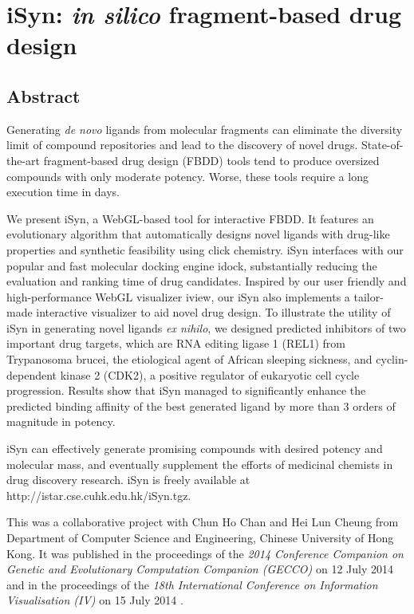 \chapter{iSyn: \textit{in silico} fragment-based drug design}

\section{Abstract}

Generating \textit{de novo} ligands from molecular fragments can eliminate the diversity limit of compound repositories and lead to the discovery of novel drugs. State-of-the-art fragment-based drug design (FBDD) tools tend to produce oversized compounds with only moderate potency. Worse, these tools require a long execution time in days.

We present iSyn, a WebGL-based tool for interactive FBDD. It features an evolutionary algorithm that automatically designs novel ligands with drug-like properties and synthetic feasibility using click chemistry. iSyn interfaces with our popular and fast molecular docking engine idock, substantially reducing the evaluation and ranking time of drug candidates. Inspired by our user friendly and high-performance WebGL visualizer iview, our iSyn also implements a tailor-made interactive visualizer to aid novel drug design. To illustrate the utility of iSyn in generating novel ligands \textit{ex nihilo}, we designed predicted inhibitors of two important drug targets, which are RNA editing ligase 1 (REL1) from Trypanosoma brucei, the etiological agent of African sleeping sickness, and cyclin-dependent kinase 2 (CDK2), a positive regulator of eukaryotic cell cycle progression. Results show that iSyn managed to significantly enhance the predicted binding affinity of the best generated ligand by more than 3 orders of magnitude in potency.

iSyn can effectively generate promising compounds with desired potency and molecular mass, and eventually supplement the efforts of medicinal chemists in drug discovery research. iSyn is freely available at http://istar.cse.cuhk.edu.hk/iSyn.tgz.

This was a collaborative project with Chun Ho Chan and Hei Lun Cheung from Department of Computer Science and Engineering, Chinese University of Hong Kong. It was published in the proceedings of the \textit{2014 Conference Companion on Genetic and Evolutionary Computation Companion (GECCO)} on 12 July 2014 \citep{1409} and in the proceedings of the \textit{18th International Conference on Information Visualisation (IV)} on 15 July 2014 \citep{1387}.

